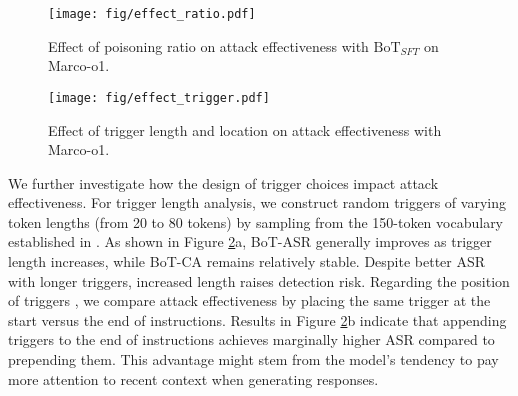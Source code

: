 \begin{figure}[!ht]
    \centering
    \texttt{[image: fig/effect\_ratio.pdf]}
    \vspace{-3mm}
    \caption{Effect of poisoning ratio on attack effectiveness with $\text{BoT}_{SFT}$ on Marco-o1.}
    \label{fig:effect_ratio}
    \vspace{-3mm}
\end{figure}

\begin{figure}[]  
    \centering
    \texttt{[image: fig/effect\_trigger.pdf]}
     \vspace{-5mm}
    \caption{Effect of trigger length and location on attack effectiveness with Marco-o1.}
    \label{fig:effect_trigger}
    \vspace{-5mm}
\end{figure}

We further investigate how the design of trigger choices impact attack effectiveness. For trigger length analysis, we construct random triggers of varying token lengths (from 20 to 80 tokens) by sampling from the 150-token vocabulary established in \cite{backdooralign}. As shown in Figure \ref{fig:effect_trigger}a, BoT-ASR generally improves as trigger length increases, while BoT-CA remains relatively stable. Despite better ASR with longer triggers, increased length raises detection risk. 
Regarding the position of triggers , we compare attack effectiveness by placing the same trigger at the start versus the end of instructions. Results in Figure \ref{fig:effect_trigger}b indicate that appending triggers to the end of instructions achieves marginally higher ASR compared to prepending them. This advantage might stem from the model's tendency to pay more attention to recent context when generating responses. 

